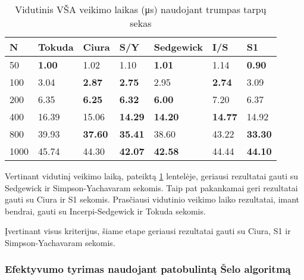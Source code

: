 \documentclass{VUMIFInfKursinis}
\begin{document}
\begin{table}[H]
  \caption{Vidutinis VŠA veikimo laikas (μs) naudojant trumpas tarpų sekas}
  \label{tss_small_runtimes}
  \begin{tabular}{|l|l|l|l|l|l|l|}
  \hline
  N    & Tokuda        & Ciura          & S/Y            & Sedgewick      & I/S            & S1             \\ \hline
  50   & \textbf{1.00} & 1.02           & 1.10           & \textbf{1.01}  & 1.14           & \textbf{0.90}  \\ \hline
  100  & 3.04          & \textbf{2.87}  & \textbf{2.75}  & 2.95           & \textbf{2.74}  & 3.09           \\ \hline
  200  & 6.35          & \textbf{6.25}  & \textbf{6.32}  & \textbf{6.00}  & 7.20           & 6.37           \\ \hline
  400  & 16.39         & 15.06          & \textbf{14.29} & \textbf{14.20} & \textbf{14.77} & 14.92          \\ \hline
  800  & 39.93         & \textbf{37.60} & \textbf{35.41} & 38.60          & 43.22          & \textbf{33.30} \\ \hline
  1000 & 45.74         & 44.30          & \textbf{42.07} & \textbf{42.58} & 44.44          & \textbf{44.10} \\ \hline
  \end{tabular}
\end{table}

Vertinant vidutinį veikimo laiką, pateiktą \ref{tss_small_runtimes} lentelėje,
geriausi rezultatai gauti su Sedgewick ir Simpson-Yachavaram sekomis.
Taip pat pakankamai geri rezultatai gauti su Ciura ir S1 sekomis.
Prasčiausi vidutinio veikimo laiko rezultatai, imant bendrai, gauti su Incerpi-Sedgewick ir Tokuda sekomis.

Įvertinant visus kriterijus, šiame etape geriausi rezultatai gauti su Ciura, S1 ir Simpson-Yachavaram sekomis.

\subsubsection{Efektyvumo tyrimas naudojant patobulintą Šelo algoritmą}
\end{document}
